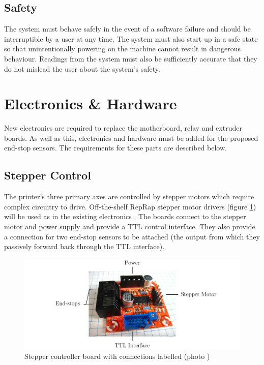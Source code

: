 		\subsection{Safety}
			
			The system must behave safely in the event of a software failure and
			should be interruptible by a user at any time. The system must also start
			up in a safe state so that unintentionally powering on the machine cannot
			result in dangerous behaviour. Readings from the system must also be
			sufficiently accurate that they do not mislead the user about the system's
			safety.
	
	\section{Electronics \& Hardware}
		
		New electronics are required to replace the motherboard, relay and extruder
		boards. As well as this, electronics and hardware must be added for the
		proposed end-stop sensors. The requirements for these parts are described
		below.
		
		\subsection{Stepper Control}
			
			The printer's three primary axes are controlled by stepper motors which
			require complex circuitry to drive. Off-the-shelf RepRap stepper motor
			drivers (figure \ref{fig:stepperControllerBoard}) will be used as in the
			existing electronics \cite{stepperMotorDriver23}. The boards connect to
			the stepper motor and power supply and provide a TTL control interface.
			They also provide a connection for two end-stop sensors to be attached
			(the output from which they passively forward back through the TTL
			interface).
			
			\begin{figure}
				\includegraphics[width=1\textwidth]{diagrams/stepperControllerBoard.pdf}
				\caption{Stepper controller board with connections labelled (photo \cite{stepperControllerBoardPhoto})}
				\label{fig:stepperControllerBoard}
			\end{figure}
			
